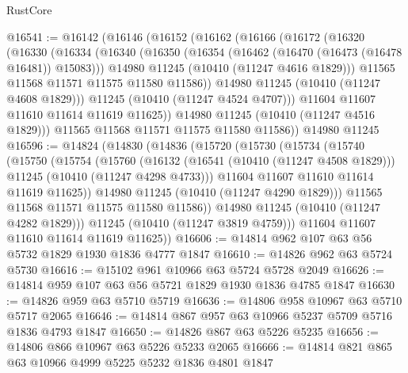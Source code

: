 \begin{lexlean}{RustCore}
\begin{coremodule}
@16541 := @16142
    (@16146
      (@16152
        (@16162
          (@16166
            (@16172
              (@16320
                (@16330
                  (@16334
                    (@16340
                      (@16350
                        (@16354 (@16462 (@16470 (@16473 (@16478 @16481)) @15083)))
                        @14980
                        @11245
                        (@10410 (@11247 @4616 @1829)))
                      @11565
                      @11568
                      @11571
                      @11575
                      @11580
                      @11586))
                  @14980
                  @11245
                  (@10410 (@11247 @4608 @1829)))
                @11245
                (@10410 (@11247 @4524 @4707)))
              @11604
              @11607
              @11610
              @11614
              @11619
              @11625))
          @14980
          @11245
          (@10410 (@11247 @4516 @1829)))
        @11565
        @11568
        @11571
        @11575
        @11580
        @11586))
    @14980
    @11245
@16596 := @14824
    (@14830
      (@14836
        (@15720
          (@15730
            (@15734
              (@15740
                (@15750
                  (@15754
                    (@15760
                      (@16132
                        (@16541 (@10410 (@11247 @4508 @1829)))
                        @11245
                        (@10410 (@11247 @4298 @4733)))
                      @11604
                      @11607
                      @11610
                      @11614
                      @11619
                      @11625))
                  @14980
                  @11245
                  (@10410 (@11247 @4290 @1829)))
                @11565
                @11568
                @11571
                @11575
                @11580
                @11586))
            @14980
            @11245
            (@10410 (@11247 @4282 @1829)))
          @11245
          (@10410 (@11247 @3819 @4759)))
        @11604
        @11607
        @11610
        @11614
        @11619
        @11625))
@16606 := @14814 @962 @107 @63 @56 @5732 @1829 @1930 @1836 @4777 @1847
@16610 := @14826 @962 @63 @5724 @5730
@16616 := @15102 @961 @10966 @63 @5724 @5728 @2049
@16626 := @14814 @959 @107 @63 @56 @5721 @1829 @1930 @1836 @4785 @1847
@16630 := @14826 @959 @63 @5710 @5719
@16636 := @14806 @958 @10967 @63 @5710 @5717 @2065
@16646 := @14814 @867 @957 @63 @10966 @5237 @5709 @5716 @1836 @4793 @1847
@16650 := @14826 @867 @63 @5226 @5235
@16656 := @14806 @866 @10967 @63 @5226 @5233 @2065
@16666 := @14814 @821 @865 @63 @10966 @4999 @5225 @5232 @1836 @4801 @1847

\end{coremodule}
\end{lexlean}
